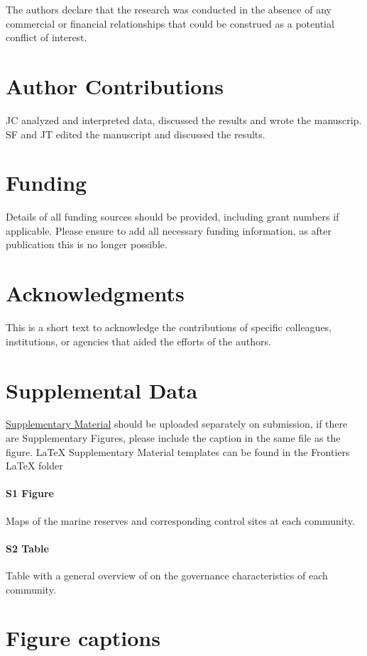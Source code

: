 \documentclass{frontiersSCNS}
\begin{document}
The authors declare that the research was conducted in the absence of
any commercial or financial relationships that could be construed as a
potential conflict of interest.

\section*{Author Contributions}

JC analyzed and interpreted data, discussed the results and wrote the
manuscrip. SF and JT edited the manuscript and discussed the results.

\section*{Funding}

Details of all funding sources should be provided, including grant
numbers if applicable. Please ensure to add all necessary funding
information, as after publication this is no longer possible.

\section*{Acknowledgments}

This is a short text to acknowledge the contributions of specific
colleagues, institutions, or agencies that aided the efforts of the
authors.

\section*{Supplemental Data}

\href{http://home.frontiersin.org/about/author-guidelines#SupplementaryMaterial}{Supplementary Material}
should be uploaded separately on submission, if there are Supplementary
Figures, please include the caption in the same file as the figure.
LaTeX Supplementary Material templates can be found in the Frontiers
LaTeX folder

\paragraph*{S1 Figure}
\label{S1_Figure}

Maps of the marine reserves and corresponding control sites at each
community.

\paragraph*{S2 Table}
\label{S2_Table}

Table with a general overview of on the governance characteristics of
each community.



\section*{Figure captions}
\end{document}
